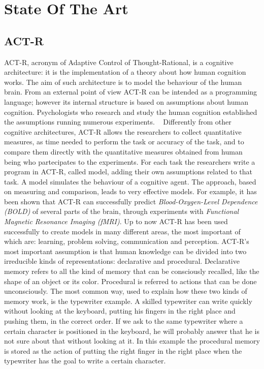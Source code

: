 \chapter{State Of The Art}
  \section{ACT-R}
	ACT-R, acronym of Adaptive Control of Thought-Rational, is a cognitive architecture: it is the implementation of a theory about how human cognition works. 
	The aim of such architecture is to model the behaviour of the human brain. From an external point of view \mbox{ACT-R} can be intended as a programming language; however its internal structure is based on assumptions about human cognition. Psychologists who research and study the human cognition established the assumptions running numerous experiments.  ~\cite{Allen94}
	Differently from other cognitive architectures, \mbox{ACT-R} allows the researchers to collect quantitative measures, as time needed to perform the task or accuracy of the task, and to compare them directly with the quantitative measures obtained from human being who partecipates to the experiments. For each task the researchers write a program in \mbox{ACT-R}, called model, adding their own assumptions related to that task. 
	A model simulates the behaviour of a cognitive agent. The approach, based on measuring and comparison, leads to very effective models. For example, it has been shown that \mbox{ACT-R} can successfully predict \emph{Blood-Oxygen-Level Dependence (BOLD)} of several parts of the brain, through experiments with \emph{Functional Magnetic Resonance Imaging (fMRI)}.
	Up to now \mbox{ACT-R} has been used successfully to create models in many different areas, the most important of which are: learning, problem solving, communication and perception.
\newline
	\mbox{ACT-R's} most important assumption is that human knowledge can be divided into two irreducible kinds of representations: declarative and procedural.
	Declarative memory refers to all the kind of memory that can be consciously recalled, like the shape of an object or its color. Procedural is referred to actions that can be done unconsciously. The most common way, used to explain how these two kinds of memory work, is the typewriter example. 
	A skilled typewriter can write quickly without looking at the keyboard, putting his fingers in the right place and pushing them, in the correct order. If we ask to the same typewriter where a certain character is positioned in the keyboard, he will probably answer that he is not sure about that without looking at it. In this example the procedural memory is stored as the action of putting the right finger in the right place when the typewriter has the goal to write a certain character.

